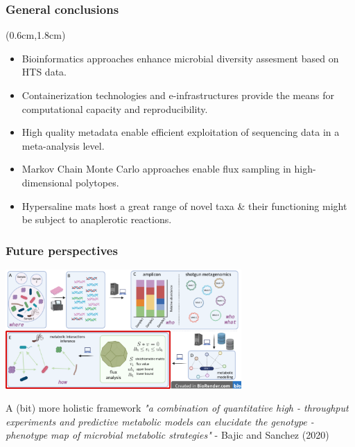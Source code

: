 \documentclass{beamer}
\begin{document}
   \begin{darkframes}

   \begin{frame}
      \frametitle{\textbf{General conclusions}}
      \begin{singlespace}
      \begin{textblock*}{11cm}(0.6cm,1.8cm)
      \small 
      \begin{itemize}
      
         \item Bioinformatics approaches enhance microbial diversity assesment based on HTS data.
         \bigskip
         \item Containerization technologies and e-infrastructures provide the means for computational capacity and reproducibility.
         \bigskip
         \item High quality metadata enable efficient exploitation of sequencing data in a meta-analysis level.
         \bigskip
         \item Markov Chain Monte Carlo approaches enable flux sampling in high-dimensional polytopes.
         \bigskip
         \item Hypersaline mats host a great range of novel taxa \& their functioning might be subject to anaplerotic reactions.
      \end{itemize}
      \end{textblock*}
   \end{singlespace}
   \end{frame}

   \begin{frame}
      \frametitle{\textbf{Future perspectives}}

      \includegraphics[width=90mm]{resources/reverse_ecology_transp_future.png}

      \begin{block}{A (bit) more holistic framework}
         \small
         \textit{
            "a combination of quantitative high - throughput experiments and predictive metabolic
            models can elucidate the genotype - phenotype map of microbial metabolic strategies"
         } - Bajic and Sanchez (2020)         %
         
      \end{block}

   \end{frame}
   \end{darkframes}
\end{document}
